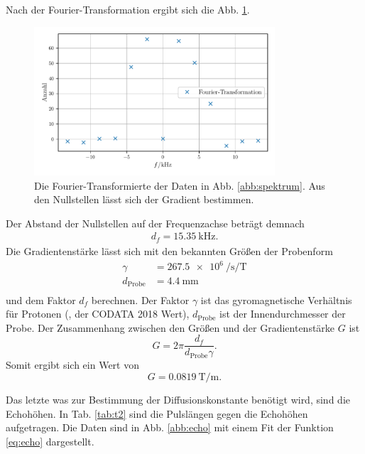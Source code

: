 Nach der Fourier-Transformation ergibt sich die Abb. \ref{abb:fourier}.
\begin{figure}
    \centering
    \includegraphics[width=0.8\textwidth]{plots/echo_gradient.pdf}
    \caption{Die Fourier-Transformierte der Daten in Abb. \ref{abb:spektrum}. Aus den Nullstellen lässt sich der Gradient bestimmen.}
    \label{abb:fourier}
\end{figure}
Der Abstand der Nullstellen auf der Frequenzachse beträgt demnach 
\begin{align*}
d_f = \SI{15.35}{\kilo\hertz}.
\end{align*} 
Die Gradientenstärke lässt sich mit den bekannten Größen der Probenform
\begin{align*}
    \gamma &= \SI{267.5e6}{\per\second\per\tesla} \\
    d_\text{Probe} &= \SI{4.4}{\milli\metre} \\ 
    \end{align*} 
und dem Faktor $d_f$ berechnen.
Der Faktor $\gamma$ ist das gyromagnetische Verhältnis für Protonen (\cite{scipy}, der CODATA 2018 Wert), $d_\text{Probe}$ ist der Innendurchmesser der Probe.
Der Zusammenhang zwischen den Größen und der Gradientenstärke $G$ ist
\begin{equation*}
G = 2 \pi \frac{d_f}{d_\text{Probe} \gamma}.
\end{equation*}
Somit ergibt sich ein Wert von 
\begin{equation*}
G = \SI{0.0819}{\tesla\per\metre}.
\end{equation*}



Das letzte was zur Bestimmung der Diffusionskonstante benötigt wird, sind die Echohöhen. In Tab. \ref{tab:t2} sind die Pulslängen gegen die Echohöhen aufgetragen. Die Daten sind in Abb. \ref{abb:echo} mit einem Fit der Funktion \eqref{eq:echo} dargestellt. 

